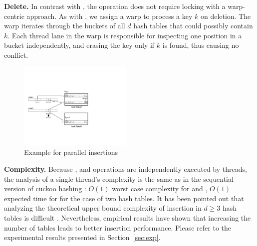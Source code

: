 \vspace{1mm}\noindent\textbf{Delete.} 
In contrast with , the  operation does not require locking with a warp-centric approach. 
As with , we assign a warp to process a key $k$ on deletion. The warp iterates through the buckets of all $d$ hash tables that could possibly contain $k$. Each thread lane in the warp is responsible for inspecting one position in a bucket independently, and erasing the key only if $k$ is found, thus causing no conflict.



\begin{figure}[t]
	\centering
	\includegraphics[width=0.48\textwidth]{fig/Voter.pdf}
	\vspace{-1em}
	\caption{Example for parallel insertions}
	\label{fig:voter}
\end{figure}
\vspace{1mm}\noindent\textbf{Complexity.}
Because ,  and  operations are independently executed by threads, 
the analysis of a single thread's complexity is the same as in the sequential version of cuckoo hashing \cite{pagh2004cuckoo}: $O(1)$ worst case complexity for  and , $O(1)$ expected time for  for the case of two hash tables. 
It has been pointed out that analyzing the theoretical upper bound complexity of insertion in $d \geq 3$ hash tables is difficult \cite{alcantara2009real}.  
Nevertheless, empirical results have shown that increasing the number of tables leads to better insertion performance. Please refer to the experimental results presented in Section~\ref{sec:exp}.

